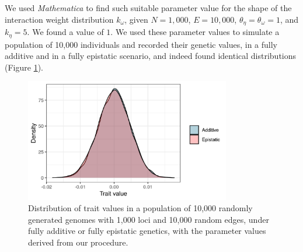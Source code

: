 \documentclass[]{article}
\begin{document}
We used \textit{Mathematica} to find such suitable parameter value for the shape of the interaction weight distribution $k_{\omega}$, given $N = 1,000$, $E = 10,000$, $\theta_{\eta} = \theta_{\omega} = 1$, and $k_{\eta} = 5$. We found a value of $1$. We used these parameter values to simulate a population of 10,000 individuals and recorded their genetic values, in a fully additive and in a fully epistatic scenario, and indeed found identical distributions (Figure \ref{fig:densities}).

\begin{figure}[H]
	\centering
	\includegraphics[width=0.8\textwidth]{parametrized_trait_distributions}
	\caption{Distribution of trait values in a population of 10,000 randomly generated genomes with 1,000 loci and 10,000 random edges, under fully additive or fully epistatic genetics, with the parameter values derived from our procedure.}
	\label{fig:densities}
\end{figure}
\end{document}
